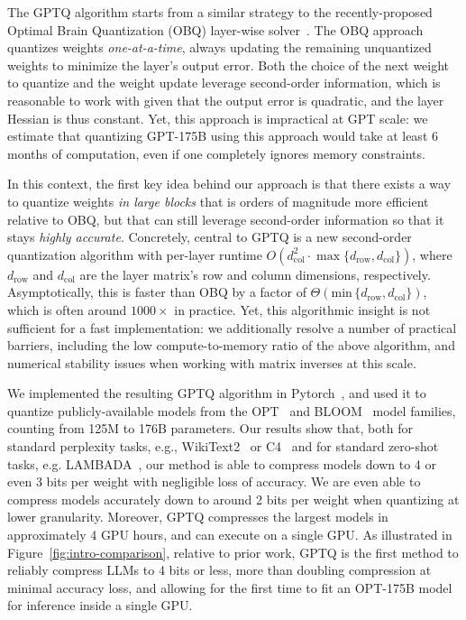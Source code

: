 The GPTQ algorithm starts from a similar strategy to the recently-proposed Optimal Brain Quantization (OBQ) layer-wise solver~\cite{frantar2022obc}.  
The OBQ approach quantizes weights \emph{one-at-a-time}, always updating the remaining unquantized weights to minimize the layer's output error. 
Both the choice of the next weight to quantize and the weight update leverage second-order information, which is reasonable to work with given that the output error is quadratic, and the layer Hessian is thus constant. 
Yet, this approach is impractical at GPT scale: we estimate that quantizing GPT-175B using this approach would take at least 6 months of computation, even if one completely ignores memory constraints. 

In this context, the first key idea behind our approach is that there exists a way to quantize weights \emph{in large blocks} that is orders of magnitude more efficient relative to OBQ, but that can still leverage second-order information so that it stays \emph{highly accurate}. 
Concretely, central to GPTQ is a new second-order quantization algorithm with per-layer runtime $O( d_\text{col}^2 \cdot \max \{ d_\text{row} , d_\text{col} \})$, 
where $d_\text{row}$ and $d_\text{col}$ are the layer matrix's row and column dimensions, respectively. 
Asymptotically, this is faster than OBQ by a factor of $\Theta(\text{min} \, \{d_\text{row}, d_\text{col}\})$, which is often around $1000\times$ in practice.
Yet, this algorithmic insight is not sufficient for a fast implementation: we additionally resolve a number of practical barriers, including the low compute-to-memory ratio of the above algorithm, and numerical stability issues when working with matrix inverses at this scale.

We implemented the resulting GPTQ algorithm in Pytorch~\cite{paszke2019pytorch}, and used it to quantize publicly-available models from the OPT~\cite{zhang2022opt} and BLOOM~\cite{laurencconbigscience} model families, counting from 125M to 176B parameters. 
Our results show that, both for standard perplexity tasks, e.g., WikiText2~\cite{wikitext103} or C4~\cite{C4} and for standard zero-shot tasks, e.g. LAMBADA~\cite{paperno2016lambada}, our method is able to compress models down to 4 or even 3 bits per weight with negligible loss of accuracy. We are even able to compress models accurately down to around 2 bits per weight when quantizing at lower granularity. 
Moreover, GPTQ compresses the largest models in approximately 4 GPU hours, and can execute on a single GPU.  
As illustrated in Figure~\ref{fig:intro-comparison}, relative to prior work, GPTQ is the first method to reliably compress LLMs to 4 bits or less, more than doubling compression at minimal accuracy loss, and allowing for the first time to fit an OPT-175B model for inference inside a single GPU.

